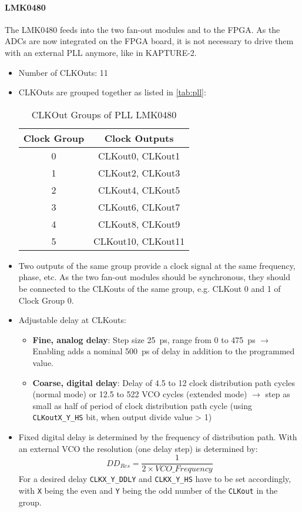\paragraph{LMK0480}
The LMK0480 feeds into the two fan-out modules and to the FPGA. As the ADCs are now integrated on the FPGA board, it is not necessary to drive them with an external PLL anymore, like in KAPTURE-2.
\begin{itemize}
	\item Number of CLKOuts: 11
	\item CLKOuts are grouped together as listed in \autoref{tab:pll}:
		\begin{table}[H]
			\caption{CLKOut Groups of PLL LMK0480}
			\label{tab:pll}
			\centering
			\begin{tabularx}{0.5\textwidth}{cc}
					\toprule
					\textbf{Clock Group} & \textbf{Clock Outputs} \\
						\midrule
					0	& CLKout0, CLKout1\\
					1	& CLKout2, CLKout3\\
					2	& CLKout4, CLKout5\\
					3	& CLKout6, CLKout7\\
					4	& CLKout8, CLKout9\\
					5	& CLKout10, CLKout11\\
					\bottomrule
				\end{tabularx}
		\end{table}
		\item Two outputs of the same group provide a clock signal at the same frequency, phase, etc. As the two fan-out modules should be synchronous, they should be connected to the CLKouts of the same group, e.g. CLKout 0 and 1 of Clock Group 0.
	\item Adjustable delay at CLKouts: 
	\begin{itemize}
		\item \textbf{Fine, analog delay}: Step size \SI{25}{\pico\second}, range from 0 to \SI{475}{\pico \second} \newline 
		$\rightarrow$ Enabling adds a nominal \SI{500}{\pico\second} of delay in addition to the programmed value.
		\item \textbf{Coarse, digital delay}: Delay of 4.5 to 12 clock distribution path cycles (normal mode) or 12.5 to 522 VCO cycles (extended mode) $\rightarrow$ step as small as half of period of clock distribution path cycle (using \texttt{CLKoutX\_Y\_HS} bit, when output divide value > 1)
	\end{itemize}

\item Fixed digital delay is determined by the frequency of distribution path. With an external VCO the resolution (one delay step) is determined by: 
	\begin{equation}
		DD_{Res}=\frac{1}{2\times VCO\_Frequency}
	\end{equation}
	For a desired delay \texttt{CLKX\_Y\_DDLY} and \texttt{CLKX\_Y\_HS} have to be set accordingly, with \texttt{X} being the even and \texttt{Y} being the odd number of the \texttt{CLKout} in the group.
\end{itemize}

